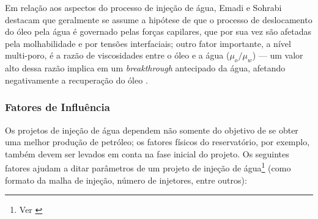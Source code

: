 Em rela\c{c}\~{a}o aos aspectos do processo de inje\c{c}\~{a}o de \'{a}gua, Emadi e Sohrabi destacam que geralmente se assume a hip\'{o}tese de que o processo de deslocamento do \'{o}leo pela \'{a}gua \'{e} governado pelas for\c{c}as capilares, que por sua vez s\~{a}o afetadas pela molhabilidade e por tens\~{o}es interfaciais; outro fator importante, a n\'{i}vel multi-poro, \'{e} a raz\~{a}o de viscosidades entre o \'{o}leo e a \'{a}gua ($\mu_o/\mu_w$) --- um valor alto dessa raz\~{a}o implica em um \textit{breakthrough} antecipado da \'{a}gua, afetando negativamente a recupera\c{c}\~{a}o do \'{o}leo \cite{emadi2012}.
\subsubsection{Fatores de Influ\^{e}ncia}

Os projetos de inje\c{c}\~{a}o de \'{a}gua dependem n\~{a}o somente do objetivo de se obter uma melhor produ\c{c}\~{a}o de petr\'{o}leo; os fatores f\'{i}sicos do reservat\'{o}rio, por exemplo, tamb\'{e}m devem ser levados em conta na fase inicial do projeto. Os seguintes fatores ajudam a ditar par\^{a}metros de um projeto de inje\c{c}\~{a}o de \'{a}gua\footnote{Ver \cite[pp. 652-653]{engres}} (como formato da malha de inje\c{c}\~{a}o, n\'{u}mero de injetores, entre outros):

